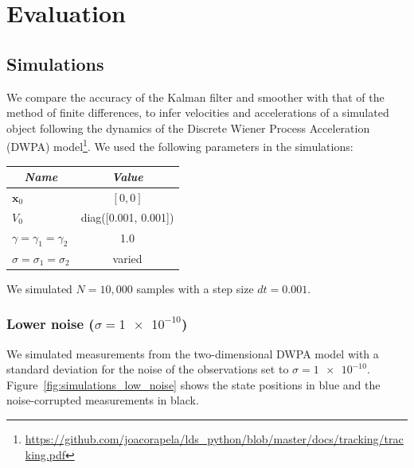 \documentclass[12pt]{article}
\begin{document}
\section{Evaluation}

\subsection{Simulations}

We compare the accuracy of the Kalman filter and smoother with that of the
method of finite differences, to infer velocities and accelerations of a
simulated object following the dynamics of the Discrete Wiener Process
Acceleration (DWPA)
model\footnote{\url{https://github.com/joacorapela/lds_python/blob/master/docs/tracking/tracking.pdf}}.  We used the following parameters in the
simulations:

\begin{center}
    \begin{tabular}{|l|c|}\hline
        \multicolumn{1}{|c|}{\emph{Name}} & \multicolumn{1}{|c|}{\emph{Value}} \\\hline\hline
        $\mathbf{x}_0$                        & $[0, 0]$\\\hline
        $V_0$                                 & diag([0.001, 0.001])\\\hline
        $\gamma=\gamma_1=\gamma_2$            & 1.0\\\hline
        $\sigma=\sigma_1=\sigma_2$            & varied\\\hline
    \end{tabular}
\end{center}

\noindent We simulated $N=10,000$ samples with a step size $dt=0.001$.

\subsubsection{Lower noise ($\sigma=\num{1e-10}$)}

We simulated measurements from the two-dimensional DWPA model with a standard
deviation for the noise of the observations set to $\sigma=\num{1e-10}$.
Figure~\ref{fig:simulations_low_noise} shows the state positions in blue and
the noise-corrupted measurements in black.
\end{document}
